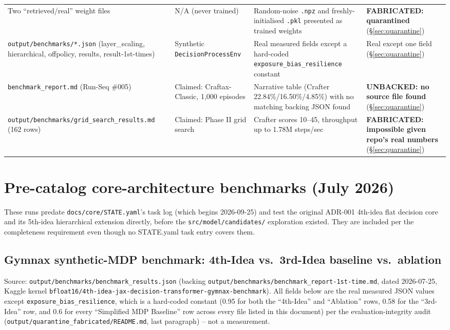 \documentclass[11pt]{article}
\newcommand{\srcpath}[1]{\texttt{\small #1}}
\newcommand{\fabricated}[1]{\textcolor{red!60!black}{\textbf{FABRICATED: #1}}}
\newcommand{\unbacked}[1]{\textcolor{orange!70!black}{\textbf{UNBACKED: #1}}}
\begin{document}
\begin{longtable}{@{}p{3.4cm}p{3.0cm}p{5.7cm}p{2.6cm}@{}}
Two ``retrieved/real'' weight files & N/A (never trained) & Random-noise \texttt{.npz} and freshly-initialised \texttt{.pkl} presented as trained weights & \fabricated{quarantined} (\S\ref{sec:quarantine}) \\
\texttt{output/benchmarks/*.json} (layer\_scaling, hierarchical, offpolicy, results, result-1st-times) & Synthetic \texttt{DecisionProcessEnv} & Real measured fields except a hard-coded \texttt{exposure\_bias\_resilience} constant & Real except one field (\S\ref{sec:quarantine}) \\
\texttt{benchmark\_report.md} (Run-Seq \#005) & Claimed: Craftax-Classic, 1{,}000 episodes & Narrative table (Crafter 22.84\%/16.50\%/4.85\%) with no matching backing JSON found & \unbacked{no source file found} (\S\ref{sec:quarantine}) \\
\texttt{output/benchmarks/grid\_search\_results.md} (162 rows) & Claimed: Phase II grid search & Crafter scores 10--45, throughput up to 1.78M steps/sec & \fabricated{impossible given repo's real numbers} (\S\ref{sec:quarantine}) \\
\bottomrule
\end{longtable}

\clearpage
\section{Pre-catalog core-architecture benchmarks (July 2026)}
\label{sec:precatalog}

These runs predate \srcpath{docs/core/STATE.yaml}'s task log (which begins 2026-09-25) and test the
original ADR-001 4th-idea flat decision core and its 5th-idea hierarchical extension directly,
before the \texttt{src/model/candidates/} exploration existed. They are included per the
completeness requirement even though no STATE.yaml task entry covers them.

\subsection{Gymnax synthetic-MDP benchmark: 4th-Idea vs.\ 3rd-Idea baseline vs.\ ablation}

Source: \srcpath{output/benchmarks/benchmark\_results.json} (backing
\srcpath{output/benchmarks/benchmark\_report-1st-time.md}, dated 2026-07-25, Kaggle kernel
\texttt{bfloat16/4th-idea-jax-decision-transformer-gymnax-benchmark}). All fields below are the
real measured JSON values except \texttt{exposure\_bias\_resilience}, which is a hard-coded
constant (0.95 for both the ``4th-Idea'' and ``Ablation'' rows, 0.58 for the ``3rd-Idea'' row, and
0.6 for every ``Simplified MDP Baseline'' row across every file listed in this document) per the
evaluation-integrity audit (\srcpath{output/quarantine\_fabricated/README.md}, last paragraph) --
not a measurement.
\end{document}
